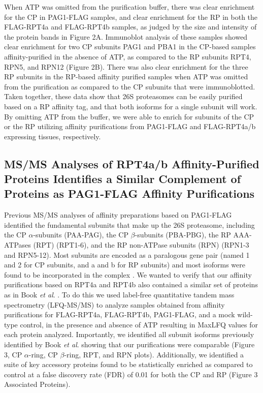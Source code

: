 	When ATP was omitted from the purification buffer, there was clear enrichment for the CP in PAG1-FLAG samples, and clear enrichment for the RP in both the FLAG-RPT4a and FLAG-RPT4b samples, as judged by the size and intensity of the protein bands in Figure 2A. Immunoblot analysis of these samples showed clear enrichment for two CP subunits PAG1 and PBA1 in the CP-based samples affinity-purified in the absence of ATP, as compared to the RP subunits RPT4, RPN5, and RPN12 (Figure 2B). There was also clear enrichment for the three RP subunits in the RP-based affinity purified samples when ATP was omitted from the purification as compared to the CP subunits that were immunoblotted.  Taken together, these data show that 26S proteasomes can be easily purified based on a RP affinity tag, and that both isoforms for a single subunit will work. By omitting ATP from the buffer, we were able to enrich for subunits of the CP or the RP utilizing affinity purifications from PAG1-FLAG and FLAG-RPT4a/b expressing tissues, respectively. 

\subsection{MS/MS Analyses of RPT4a/b Affinity-Purified Proteins Identifies a Similar Complement of Proteins as PAG1-FLAG Affinity Purifications}

	Previous MS/MS analyses of affinity preparations based on PAG1-FLAG identified the fundamental subunits that make up the 26S proteasome, including the CP $\alpha$-subunits (PAA-PAG), the CP $\beta$-subunits (PBA-PBG), the RP AAA-ATPases (RPT) (RPT1-6), and the RP non-ATPase subunits (RPN) (RPN1-3 and RPN5-12). Most subunits are encoded as a paralogous gene pair (named 1 and 2 for CP subunits, and a and b for RP subunits) and most isoforms were found to be incorporated in the complex \citep{book10}. We wanted to verify that our affinity purifications based on RPT4a and RPT4b also contained a similar set of proteins as in Book \textit{et al}. \citep{book10}. To do this we used label-free quantitative tandem mass spectrometry (LFQ-MS/MS) to analyze samples obtained from affinity purifications for FLAG-RPT4a, FLAG-RPT4b, PAG1-FLAG, and a mock wild-type control, in the presence and absence of ATP resulting in MaxLFQ values \citep{cox14} for each protein analyzed. Importantly, we identified all subunit isoforms previously identified by Book \textit{et al}. \citep{book10} showing that our purifications were comparable (Figure 3, CP $\alpha$-ring, CP $\beta$-ring, RPT, and RPN plots).  Additionally, we identified a suite of key accessory proteins found to be statistically enriched as compared to control at a false discovery rate (FDR) of 0.01 for both the CP and RP (Figure 3 Associated Proteins).
	
